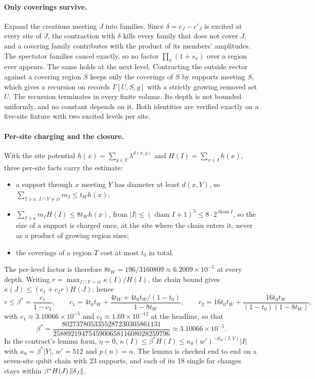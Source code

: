 \paragraph{Only coverings survive.} Expand the creations meeting $J$ into
families. Since $\delta=c_J-c'_J$ is excited at every site of $J$, the
contraction with $\delta$ kills every family that does not cover $J$, and a
covering family contributes with the product of its members' amplitudes. The
spectator families cancel exactly, so no factor $\prod_x(1+s_x)$ over a
region ever appears. The same holds at the next level. Contracting the
outside vector against a covering region $S$ keeps only the coverings of $S$
by supports meeting $S$, which gives a recursion on records
$\Gamma[U,S,g]$ with a strictly growing removed set $U$. The recursion
terminates in every finite volume. Its depth is not bounded uniformly, and no
constant depends on it. Both identities are verified exactly on a five-site
fixture with two excited levels per site.

\paragraph{Per-site charging and the closure.} With the site potential
$h(x)=\sum_{y\in Y}\lambda^{d(x,y)}$ and $H(I)=\sum_{x\in I}h(x)$, three
per-site facts carry the estimate:
\begin{itemize}
\item a support through $x$ meeting $Y$ has diameter at least $d(x,Y)$, so
 $\sum_{I\ni x,\,I\cap Y\ne\varnothing}m_I\le t_Wh(x)$;
\item $\sum_{I\ni x}m_IH(I)\le8t_Wh(x)$, from
 $|I|\le(\operatorname{diam}I+1)^3\le8\cdot2^{\operatorname{diam}I}$, so the
 size of a support is charged once, at the site where the chain enters it,
 never as a product of growing region sizes;
\item the coverings of a region $T$ cost at most $t_0$ in total.
\end{itemize}
The per-level factor is therefore $8t_W=196/3160809\approx6.2009\times10^{-5}$
at every depth. Writing $r=\max_{I\cap Y=\varnothing}\kappa(I)/H(I)$, the
chain bound gives $\kappa(J)\le(c_1+c_2r)H(J)$, hence
\begin{equation}
 r\le\beta^*=\frac{c_1}{1-c_2},\qquad
 c_1=4t_0t_W+\frac{4t_W+4t_0t_W/(1-t_0)}{1-8t_W},\qquad
 c_2=16t_0t_W+\frac{16t_0t_W}{(1-t_0)(1-8t_W)},
 \label{eq:bb1-closure}
\end{equation}
with $c_1\approx3.10066\times10^{-5}$ and $c_2\approx1.69\times10^{-12}$ at
the headline, so that
\[
 \beta^*=\frac{8027378053355287230305861131}{258892194754590065811608028259796}
 \approx3.10066\times10^{-5}.
\] In the contract's lemma form,
$\eta=0$, $\kappa(I)\le\beta^*H(I)\le\kappa_0(w')^{-d_\infty(I,Y)}|I|$ with
$\kappa_0=\beta^*|Y|$, $w'=512$ and $p(n)=n$. The lemma is checked end to end
on a seven-site qubit chain with 23 supports, and each of its 18 single far
changes stays within $\beta^*H(J)\left\lVert\delta_J\right\rVert$.

